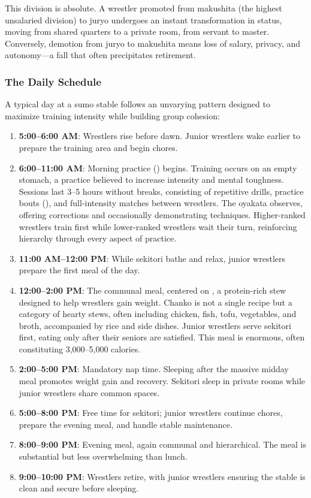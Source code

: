 This division is absolute. A wrestler promoted from makushita (the highest unsalaried division) to juryo undergoes an instant transformation in status, moving from shared quarters to a private room, from servant to master. Conversely, demotion from juryo to makushita means loss of salary, privacy, and autonomy—a fall that often precipitates retirement.

\subsubsection{The Daily Schedule}

A typical day at a sumo stable follows an unvarying pattern designed to maximize training intensity while building group cohesion:

\begin{enumerate}
\item \textbf{5:00--6:00 AM}: Wrestlers rise before dawn. Junior wrestlers wake earlier to prepare the training area and begin chores.
\item \textbf{6:00--11:00 AM}: Morning practice () begins. Training occurs on an empty stomach, a practice believed to increase intensity and mental toughness. Sessions last 3--5 hours without breaks, consisting of repetitive drills, practice bouts (), and full-intensity matches between wrestlers. The oyakata observes, offering corrections and occasionally demonstrating techniques. Higher-ranked wrestlers train first while lower-ranked wrestlers wait their turn, reinforcing hierarchy through every aspect of practice.
\item \textbf{11:00 AM--12:00 PM}: While sekitori bathe and relax, junior wrestlers prepare the first meal of the day.
\item \textbf{12:00--2:00 PM}: The communal meal, centered on , a protein-rich stew designed to help wrestlers gain weight. Chanko is not a single recipe but a category of hearty stews, often including chicken, fish, tofu, vegetables, and broth, accompanied by rice and side dishes. Junior wrestlers serve sekitori first, eating only after their seniors are satisfied. This meal is enormous, often constituting 3,000--5,000 calories.
\item \textbf{2:00--5:00 PM}: Mandatory nap time. Sleeping after the massive midday meal promotes weight gain and recovery. Sekitori sleep in private rooms while junior wrestlers share common spaces.
\item \textbf{5:00--8:00 PM}: Free time for sekitori; junior wrestlers continue chores, prepare the evening meal, and handle stable maintenance.
\item \textbf{8:00--9:00 PM}: Evening meal, again communal and hierarchical. The meal is substantial but less overwhelming than lunch.
\item \textbf{9:00--10:00 PM}: Wrestlers retire, with junior wrestlers ensuring the stable is clean and secure before sleeping.
\end{enumerate}

